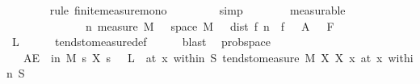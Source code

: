 \begin{isabellebody}
\ \ \ \ \ \ \isamarkupfalse%
\ {\isacharparenleft}{\kern0pt}rule\ finite{\isacharunderscore}{\kern0pt}measure{\isacharunderscore}{\kern0pt}mono{\isacharparenright}{\kern0pt}\isanewline
\ \ \ \ \ \ \ \isamarkupfalse%
\ simp\isanewline
\ \ \ \ \ \ \isamarkupfalse%
\ measurable\isanewline
\ \ \ \ \ \ \isamarkupfalse%
\ \ \ \ \ \ \isanewline
\ \ \ \ \isamarkupfalse%
\ \isamarkupfalse%
\ {\isachardoublequoteopen}{\isacharparenleft}{\kern0pt}{\isacharparenleft}{\kern0pt}{\isasymlambda}n{\isachardot}{\kern0pt}\ measure\ M\ {\isacharparenleft}{\kern0pt}{\isacharbraceleft}{\kern0pt}{\isasymomega}\ {\isasymin}\ space\ M{\isachardot}{\kern0pt}\ {\isasymepsilon}\ {\isacharless}{\kern0pt}\ dist\ {\isacharparenleft}{\kern0pt}f{\isacharprime}{\kern0pt}\ n\ {\isasymomega}{\isacharparenright}{\kern0pt}\ {\isacharparenleft}{\kern0pt}f\ {\isasymomega}{\isacharparenright}{\kern0pt}{\isacharbraceright}{\kern0pt}\ {\isasyminter}\ A{\isacharparenright}{\kern0pt}{\isacharparenright}{\kern0pt}\ {\isasymlonglongrightarrow}\ {}{\isacharparenright}{\kern0pt}\ F{\isachardoublequoteclose}\isanewline
\ \ \ \ \ \ \isamarkupfalse%
\isanewline
\ \ \isacommand{{\isacharbraceright}{\kern0pt}}\isamarkupfalse%
\isanewline
\ \ \isamarkupfalse%
\ \isamarkupfalse%
\ {\isacharquery}{\kern0pt}L\isanewline
\ \ \ \ \isamarkupfalse%
\ tendsto{\isacharunderscore}{\kern0pt}measure{\isacharunderscore}{\kern0pt}def\isanewline
\ \ \ \ \isamarkupfalse%
\ blast\isanewline
{}\isamarkupfalse%
%
\endisatagproof
{\isafoldproof}%
%
\isadelimproof
\isanewline
%
\endisadelimproof
\isanewline
{}\isamarkupfalse%
\ {\isacharparenleft}{\kern0pt}\ prob{\isacharunderscore}{\kern0pt}space{\isacharparenright}{\kern0pt}\isanewline
\ \ \ {\isachardoublequoteopen}AE\ {\isasymomega}\ in\ M{\isachardot}{\kern0pt}\ {\isacharparenleft}{\kern0pt}{\isacharparenleft}{\kern0pt}{\isasymlambda}s{\isachardot}{\kern0pt}\ X\ s\ {\isasymomega}{\isacharparenright}{\kern0pt}\ {\isasymlonglongrightarrow}\ L\ {\isasymomega}{\isacharparenright}{\kern0pt}\ {\isacharparenleft}{\kern0pt}at\ x\ within\ S{\isacharparenright}{\kern0pt}{\isachardoublequoteclose}\ {\isachardoublequoteopen}tendsto{\isacharunderscore}{\kern0pt}measure\ M\ X\ {\isacharparenleft}{\kern0pt}X\ x{\isacharparenright}{\kern0pt}\ {\isacharparenleft}{\kern0pt}at\ x\ within\ S{\isacharparenright}{\kern0pt}{\isachardoublequoteclose}\isanewline

\end{isabellebody}
